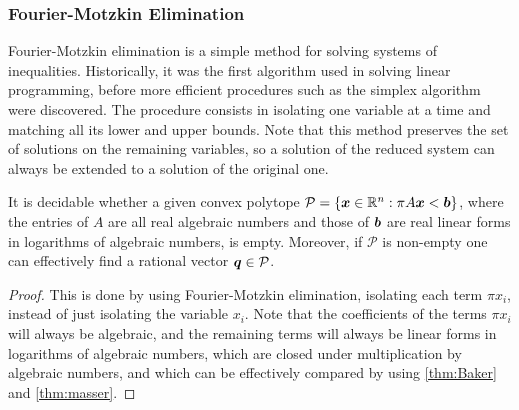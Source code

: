 \subsubsection{Fourier-Motzkin Elimination}

Fourier-Motzkin elimination is a simple method for solving systems of
inequalities. Historically, it was the first algorithm used in solving
linear programming, before more efficient procedures such as the
simplex algorithm were discovered. The procedure consists in isolating one
variable at a time and matching all its lower and upper bounds. Note
that this method preserves the set of solutions on the remaining
variables, so a solution of the reduced system can always be extended
to a solution of the original one.

\begin{theorem}
\label{thm:fme}
  It is decidable whether a
  given convex polytope
  $\mathcal{P} = \lbrace \boldsymbol{x} \in \mathbb{R}^{n} : \pi
  A\boldsymbol{x} < \boldsymbol{b} \rbrace$,
  where the entries of $A$ are all real algebraic numbers and
  those of $\boldsymbol{b}$ are real linear forms in logarithms of
  algebraic numbers, is empty.  Moreover, if $\mathcal{P}$ is
  non-empty one can effectively find a rational vector
  $\boldsymbol{q} \in \mathcal{P}$.
\end{theorem}

\begin{proof}
This is done by using Fourier-Motzkin elimination, isolating each term $\pi x_{i}$, instead of just isolating the variable $x_{i}$. Note that the coefficients of the terms $\pi x_{i}$ will always be algebraic, and the remaining terms will always be linear forms in logarithms of algebraic numbers, which are closed under multiplication by algebraic numbers, and which can be effectively compared by using \cref{thm:Baker} and \cref{thm:masser}.
\end{proof}
